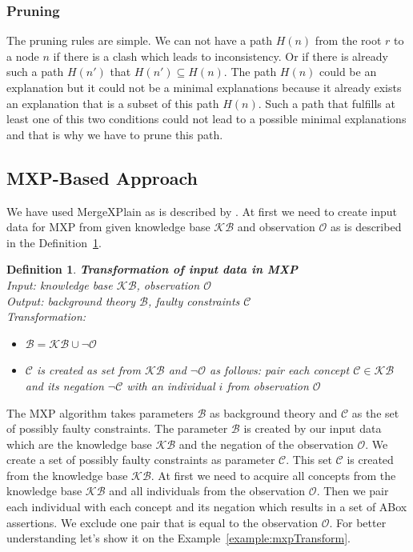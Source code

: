\documentclass[12pt,a4paper]{article}
\newtheorem{definition}{Definition}[subsection]
\begin{document}
\subsubsection{Pruning}
\label{subsubsection:pruning}
The pruning rules are simple. We can not have a path $H(n)$ from the root $r$ to a node $n$ if there is a clash which leads to inconsistency. Or if there is already such a path $H(n')$ that $H(n') \subseteq H(n)$. The path $H(n)$ could be an explanation but it could not be a minimal explanations because it already exists an explanation that is a subset of this path $H(n)$. Such a path that fulfills at least one of this two conditions could not lead to a possible minimal explanations and that is why we have to prune this path.

\subsection{MXP-Based Approach}
\label{subsection:MXPBasedApproach}
We have used MergeXPlain as is described by \cite{MXP}. At first we need to create input data for MXP from given knowledge base $\mathcal{KB}$ and observation $\mathcal{O}$ as is described in the Definition~\ref{def:mxpTransform}. 

\begin{definition}{\textbf{Transformation of input data in MXP}} \\
	\label{def:mxpTransform}
	\noindent Input: knowledge base $\mathcal{KB}$, observation $\mathcal{O}$ \\
	Output: background theory $\mathcal{B}$, faulty constraints $\mathcal{C}$ \\
	Transformation: 
	\begin{itemize}
		\item $\mathcal{B} = \mathcal{KB} \cup \neg \mathcal{O}$ 
		\item $\mathcal{C}$ is created as set from $\mathcal{KB}$ and $\neg \mathcal{O}$ as follows: pair each concept $\mathcal{C} \in \mathcal{KB}$ and its negation $\neg \mathcal{C}$ with an individual $i$ from observation $\mathcal{O}$
	\end{itemize}
\end{definition}

The MXP algorithm takes parameters $\mathcal{B}$ as background theory and $\mathcal{C}$ as the set of possibly faulty constraints. The parameter $\mathcal{B}$ is created by our input data which are the knowledge base $\mathcal{KB}$ and the negation of the observation $\mathcal{O}$. We create a set of possibly faulty constraints as parameter $\mathcal{C}$. This set $\mathcal{C}$ is created from the knowledge base $\mathcal{KB}$. At first we need to acquire all concepts from the knowledge base $\mathcal{KB}$ and all individuals from the observation $\mathcal{O}$. Then we pair each individual with each concept and its negation which results in a set of ABox assertions. We exclude one pair that is equal to the observation $\mathcal{O}$. For better understanding let's show it on the Example~\ref{example:mxpTransform}.
\end{document}

